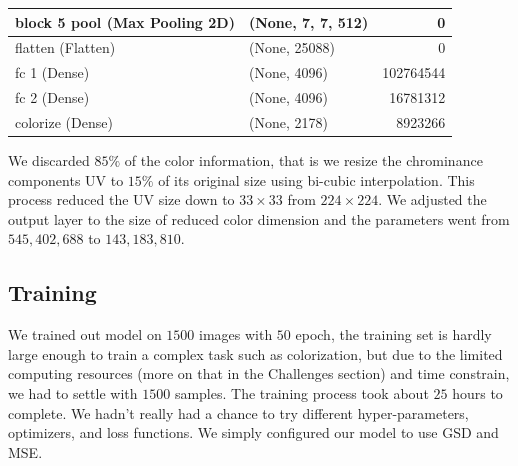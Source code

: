\documentclass[12pt]{article}
\begin{document}
\begin{table}[H]
\begin{tabular}{|l|l|r|}
		block 5 pool (Max Pooling 2D) &  (None, 7, 7, 512)      &    0           \\ \hline 
		flatten (Flatten)             &  (None, 25088)          &    0           \\ \hline 
		fc 1 (Dense)                  &  (None, 4096)           &    102764544   \\ \hline 
		fc 2 (Dense)                  &  (None, 4096)           &    16781312    \\ \hline 
		colorize (Dense)              & (None, 2178)            &    8923266     \\ \hline 
	\end{tabular}
\end{table}


We discarded $85\%$ of the color information, that is we resize the chrominance components UV to $15\%$ of its original size using bi-cubic interpolation. This process reduced the UV size down to $33\times33$ from $224\times224$. We adjusted the output layer to the size of reduced color dimension and the parameters went from $545,402,688$ to $143,183,810$. 


\subsection{Training}
We trained out model on $1500$ images with $50$ epoch, the training set is hardly large enough to train a complex task such as colorization, but due to the limited computing resources (more on that in the Challenges section) and time constrain, we had to settle with $1500$ samples. The training process took about $25$ hours to complete. We hadn't really had a chance to try different hyper-parameters, optimizers, and loss functions. We simply configured our model to use GSD and MSE. 
\end{document}
